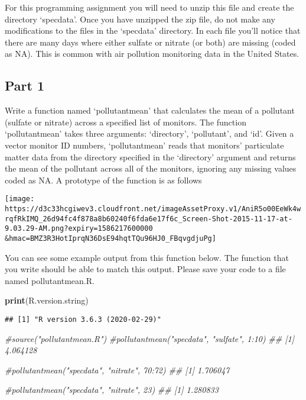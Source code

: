 \documentclass[
]{article}
\newenvironment{Shaded}{\begin{snugshade}}{\end{snugshade}}
\newcommand{\CommentTok}[1]{\textcolor[rgb]{0.56,0.35,0.01}{\textit{#1}}}
\newcommand{\KeywordTok}[1]{\textcolor[rgb]{0.13,0.29,0.53}{\textbf{#1}}}
\newcommand{\NormalTok}[1]{#1}
\begin{document}
For this programming assignment you will need to unzip this file and
create the directory `specdata'. Once you have unzipped the zip file, do
not make any modifications to the files in the `specdata' directory. In
each file you'll notice that there are many days where either sulfate or
nitrate (or both) are missing (coded as NA). This is common with air
pollution monitoring data in the United States.

\hypertarget{part-1}{%
\subsection{Part 1}\label{part-1}}

Write a function named `pollutantmean' that calculates the mean of a
pollutant (sulfate or nitrate) across a specified list of monitors. The
function `pollutantmean' takes three arguments: `directory',
`pollutant', and `id'. Given a vector monitor ID numbers,
`pollutantmean' reads that monitors' particulate matter data from the
directory specified in the `directory' argument and returns the mean of
the pollutant across all of the monitors, ignoring any missing values
coded as NA. A prototype of the function is as follows

\texttt{[image: https://d3c33hcgiwev3.cloudfront.net/imageAssetProxy.v1/AniR5o00EeWk4wrqfRkIMQ\_26d94fc4f878a8b60240f6fda6e17f6c\_Screen-Shot-2015-11-17-at-9.03.29-AM.png?expiry=1586217600000\\\&hmac=BMZ3R3HotIprqN36DsE94hqtTQu96HJ0\_FBqvgdjuPg]}

You can see some example output from this function below. The function
that you write should be able to match this output. Please save your
code to a file named pollutantmean.R.

\begin{Shaded}
\begin{Highlighting}[]
\KeywordTok{print}\NormalTok{(R.version.string)}
\end{Highlighting}
\end{Shaded}

\begin{verbatim}
## [1] "R version 3.6.3 (2020-02-29)"
\end{verbatim}

\begin{Shaded}
\begin{Highlighting}[]
\CommentTok{#source("pollutantmean.R")}
\CommentTok{#pollutantmean("specdata", "sulfate", 1:10)}
\CommentTok{## [1] 4.064128}

\CommentTok{#pollutantmean("specdata", "nitrate", 70:72)}
\CommentTok{## [1] 1.706047}

\CommentTok{#pollutantmean("specdata", "nitrate", 23)}
\CommentTok{## [1] 1.280833}
\end{Highlighting}
\end{Shaded}
\end{document}
